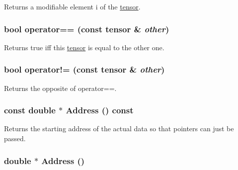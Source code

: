 Returns a modifiable element i of the \hyperlink{classJKBuilder_1_1tensor}{tensor}. \hypertarget{classJKBuilder_1_1tensor_a10ae0b61e655854d12c6465d2b9e3506}{
\subsubsection[{operator==}]{\setlength{\rightskip}{0pt plus 5cm}bool operator== (const {\bf tensor} \& {\em other})}}
\label{classJKBuilder_1_1tensor_a10ae0b61e655854d12c6465d2b9e3506}


Returns true iff this \hyperlink{classJKBuilder_1_1tensor}{tensor} is equal to the other one. \hypertarget{classJKBuilder_1_1tensor_a9b42dd835ddf2eb1a26b5d525b59b2b8}{
\subsubsection[{operator!=}]{\setlength{\rightskip}{0pt plus 5cm}bool operator!= (const {\bf tensor} \& {\em other})}}
\label{classJKBuilder_1_1tensor_a9b42dd835ddf2eb1a26b5d525b59b2b8}


Returns the opposite of operator==. \hypertarget{classJKBuilder_1_1tensor_a6a4e024f566d3bf9ba32a349afc5bbcf}{
\subsubsection[{Address}]{\setlength{\rightskip}{0pt plus 5cm}const double $\ast$ Address () const}}
\label{classJKBuilder_1_1tensor_a6a4e024f566d3bf9ba32a349afc5bbcf}


Returns the starting address of the actual data so that pointers can just be passed. \hypertarget{classJKBuilder_1_1tensor_ac982d9eb84092bfc13694448dd824cbc}{
\subsubsection[{Address}]{\setlength{\rightskip}{0pt plus 5cm}double $\ast$ Address ()}}
\label{classJKBuilder_1_1tensor_ac982d9eb84092bfc13694448dd824cbc}


